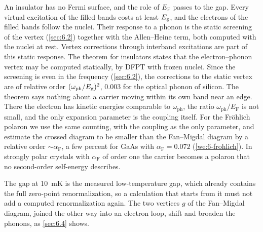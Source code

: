 An insulator has no Fermi surface, and the role of $E_{\mathrm{F}}$ passes to the gap. Every virtual excitation of the filled bands costs at least $E_{\mathrm{g}}$, and the electrons of the filled bands follow the nuclei. Their response to a phonon is the static screening of the vertex (\cref{sec:6.2}) together with the Allen--Heine term, both computed with the nuclei at rest. Vertex corrections through interband excitations are part of this static response. The theorem for insulators states that the electron--phonon vertex may be computed statically, by DFPT with frozen nuclei. Since the screening is even in the frequency (\cref{sec:6.2}), the corrections to the static vertex are of relative order $(\omega_{\mathrm{ph}}/E_{\mathrm{g}})^2$, 0.003 for the optical phonon of silicon. The theorem says nothing about a carrier moving within its own band near an edge. There the electron has kinetic energies comparable to $\omega_{\mathrm{ph}}$, the ratio $\omega_{\mathrm{ph}}/E_{\mathrm{F}}$ is not small, and the only expansion parameter is the coupling itself. For the Fr\"ohlich polaron we use the same counting, with the coupling as the only parameter, and estimate the crossed diagram to be smaller than the Fan--Migdal diagram by a relative order $\sim\alpha_{\mathrm{F}}$, a few percent for GaAs with $\alpha_{\mathrm{F}} = 0.072$ (\cref{we:6-frohlich}). In strongly polar crystals with $\alpha_{\mathrm{F}}$ of order one the carrier becomes a polaron that no second-order self-energy describes.

The gap at \SI{10}{mK} is the measured low-temperature gap, which already contains the full zero-point renormalization, so a calculation that starts from it must not add a computed renormalization again. The two vertices $g$ of the Fan--Migdal diagram, joined the other way into an electron loop, shift and broaden the phonons, as \cref{sec:6.4} shows.

